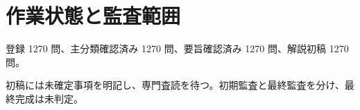 \chapter{作業状態と監査範囲}
登録 1270 問、主分類確認済み 1270 問、要旨確認済み 1270 問、解説初稿 1270 問。
\par 初稿には未確定事項を明記し、専門査読を待つ。初期監査と最終監査を分け、最終完成は未判定。
